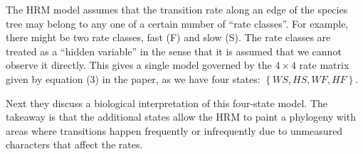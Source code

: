 \documentclass{article}
\begin{document}
The HRM model assumes that the transition rate along an edge of the species tree
may belong to any one of a certain number of ``rate classes''. For example,
there might be two rate classes, fast (F) and slow (S). The rate classes are
treated as a ``hidden variable'' in the sense that it is assumed that we cannot
observe it directly. This gives a single model governed by the $4\times4$ rate
matrix given by equation (3) in the paper, as we have four states:
$\left\{ WS, HS, WF, HF \right\}$.

Next they discuss a biological interpretation of this four-state model. The
takeaway is that the additional states allow the HRM to paint a phylogeny with
areas where transitions happen frequently or infrequently due to unmeasured
characters that affect the rates.
\end{document}
